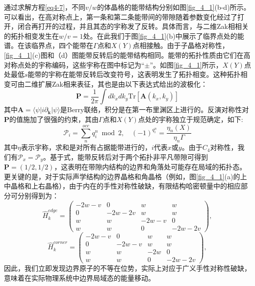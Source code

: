 通过求解方程\ref{eq4-7}，不同\(v/w\)的体晶格的能带结构分别如图\ref{fig_4_1}(b-d)所示。可以看出，在高对称点上，第一条和第二条能带间的带隙随着参数变化经过了打开，闭合再打开的过程，并且其态的宇称发了反转。具体而言，与二维Zak相相关的拓扑相变发生在\(w/v=1\)处。在此我们于图\ref{fig_4_1}(b)中展示了临界点处的能谱。在该临界点，四个能带在\(\Gamma\)点和\(X (Y)\)点相接触。由于子晶格对称性，\ref{fig_4_1}(c)图和（d）图能带反转后的能带结构相同。能带的拓扑性质由它们在高对称点处的宇称编码，这些宇称在图中标记为“\(\pm\)”。如图\ref{fig_4_1}所示，\(X (Y)\)点处最低\(s\)能带的宇称在能带反转后改变符号，这表明发生了拓扑相变。这种拓扑相变可由二维扩展Zak相来表征，其也是由以下表达式给出的波极化\cite{C45-1}：
\begin{equation}
    \mathbf{P}=\frac{1}{2\pi}\int dk_x dk_y \mathrm{Tr}[\mathbf{A}(k_x,k_y)]
    \label{eq4-10}
\end{equation}
其中\(\mathbf{A}=\langle\psi|i\partial_{\mathbf{k}}|\psi\rangle\)是Berry联络，积分是在第一布里渊区上进行的。反演对称性对\(\mathbf{P}\)的值施加了很强的约束，其由\(\Gamma\)点和\(X (Y)\)点处的宇称独立于规范确定，如下\cite{C45-2}:
\begin{equation}
    \mathcal{P}_i = \sum_{n}^{occ} q_i^n \bmod 2, \quad (-1)^{q_i^n} = \frac{\eta_n(X)}{\eta_n\Gamma}
    \label{eq4-11}
\end{equation}
其中\(\eta\)表示宇称，求和是对所有占据能带进行的，\(i\)代表\(x\)或\(y\)。由于\(C_4\)对称性，我们有\(\mathcal{P}_x = \mathcal{P}_y\)。基于式，能带反转后对于两个拓扑非平凡带隙可得到\(\mathbf{P}=(1/2,1/2)\)，这表明在带隙内结构的边界和角落处可能存在局域的拓扑态。更关键的是，对于实际声学结构的边界晶格和角晶格（例如，图\ref{fig_4_1}(a)的上中晶格和上右晶格），由于内在的手性对称性破缺，有限结构哈密顿量中的相应部分可分别得到为：
\begin{equation}
\hat{H}_k^{edge} = 
\begin{pmatrix}
-2w - v & 0 & w & w \\
0 & -2w - 2v & w & w \\
w & w & -2w - v & 0 \\
w & w & 0 & -2w - 2v
\end{pmatrix},
\label{eq4-12}
\end{equation}
\begin{equation}
\hat{H}_k^{corner} = 
\begin{pmatrix}
-2w - v & 0 & w & w \\
0 & -2w - v & w & w \\
w & w & -2w & 0 \\
w & w & 0 & -2w - 2v
\end{pmatrix},
\label{eq4-13}
\end{equation}
因此，我们立即发现边界原子的不等在位势，实际上对应于广义手性对称性破缺\cite{i5}，意味着在实际物理系统中边界局域态的能量移动。

